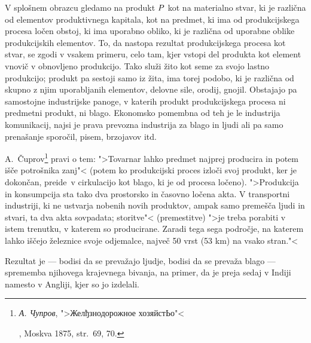 \documentclass[kapital_02.tex]{subfiles}
\begin{document}
V splošnem obrazcu gledamo na produkt \(P\) kot na materialno stvar, ki je različna od elementov produktivnega kapitala, kot na predmet, ki ima od produkcijskega procesa ločen obstoj, ki ima uporabno obliko, ki je različna od uporabne oblike produkcijskih elementov. To, da nastopa rezultat produkcijskega procesa kot stvar, se zgodi v vsakem primeru, celo tam, kjer vstopi del produkta kot element vnovič v obnovljeno produkcijo. Tako služi žito kot seme za svojo lastno produkcijo; produkt pa sestoji samo iz žita, ima torej podobo, ki je različna od skupno z njim uporabljanih elementov, delovne sile, orodij, gnojil. Obstajajo pa samostojne industrijske panoge, v katerih produkt produkcijskega procesa ni predmetni produkt, ni blago. Ekonomsko pomembna od teh je le industrija komunikacij, najsi je prava prevozna industrija za blago in ljudi ali pa samo prenašanje sporočil, pisem, brzojavov itd.

A.~Čuprov\footnote{\begin{otherlanguage}{russian}\emph{А. Чупров}, ">Желђзнодорожное хозяйстЬо"<\end{otherlanguage}, Moskva 1875, str.\ 69, 70.} pravi o tem: ">Tovarnar lahko predmet najprej producira in potem išče potrošnika zanj"< (potem ko produkcijski proces izloči svoj produkt, ker je dokončan, preide\KPEstran\ v cirkulacijo kot blago, ki je od procesa ločeno). ">Produkcija in konsumpcija sta tako dva prostorsko in časovno ločena akta. V transportni industriji, ki ne ustvarja nobenih novih produktov, ampak samo premešča ljudi in stvari, ta dva akta sovpadata; storitve"< (premestitve) ">je treba porabiti v istem trenutku, v katerem so producirane. Zaradi tega sega področje, na katerem lahko iščejo železnice svoje odjemalce, največ 50 vrst (53 km) na vsako stran."<

Rezultat je --- bodisi da se prevažajo ljudje, bodisi da se prevaža blago --- sprememba njihovega krajevnega bivanja, na primer, da je preja sedaj v Indiji namesto v Angliji, kjer so jo izdelali.
\end{document}
